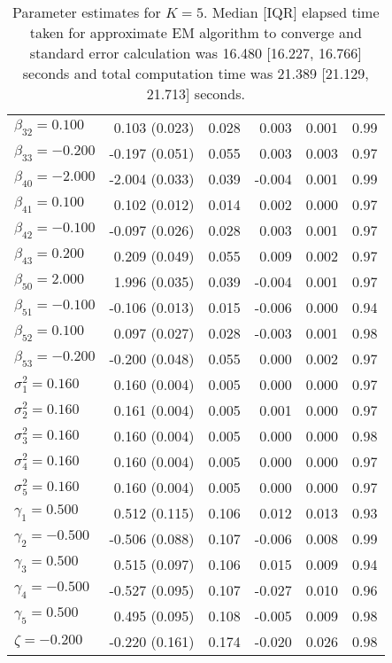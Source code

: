 \begin{table}[ht]
\begin{tabular}{l|rrrrr}
  $\beta_{32} = 0.100$ &  0.103 (0.023) & 0.028 &  0.003 & 0.001 & 0.99 \\ 
  $\beta_{33} = -0.200$ & -0.197 (0.051) & 0.055 &  0.003 & 0.003 & 0.97 \\ 
  $\beta_{40} = -2.000$ & -2.004 (0.033) & 0.039 & -0.004 & 0.001 & 0.99 \\ 
  $\beta_{41} = 0.100$ &  0.102 (0.012) & 0.014 &  0.002 & 0.000 & 0.97 \\ 
  $\beta_{42} = -0.100$ & -0.097 (0.026) & 0.028 &  0.003 & 0.001 & 0.97 \\ 
  $\beta_{43} = 0.200$ &  0.209 (0.049) & 0.055 &  0.009 & 0.002 & 0.97 \\ 
  $\beta_{50} = 2.000$ &  1.996 (0.035) & 0.039 & -0.004 & 0.001 & 0.97 \\ 
  $\beta_{51} = -0.100$ & -0.106 (0.013) & 0.015 & -0.006 & 0.000 & 0.94 \\ 
  $\beta_{52} = 0.100$ &  0.097 (0.027) & 0.028 & -0.003 & 0.001 & 0.98 \\ 
  $\beta_{53} = -0.200$ & -0.200 (0.048) & 0.055 &  0.000 & 0.002 & 0.97 \\ 
  $\sigma^2_1 = 0.160$ &  0.160 (0.004) & 0.005 &  0.000 & 0.000 & 0.97 \\ 
  $\sigma^2_2 = 0.160$ &  0.161 (0.004) & 0.005 &  0.001 & 0.000 & 0.97 \\ 
  $\sigma^2_3 = 0.160$ &  0.160 (0.004) & 0.005 &  0.000 & 0.000 & 0.98 \\ 
  $\sigma^2_4 = 0.160$ &  0.160 (0.004) & 0.005 &  0.000 & 0.000 & 0.97 \\ 
  $\sigma^2_5 = 0.160$ &  0.160 (0.004) & 0.005 &  0.000 & 0.000 & 0.97 \\ 
  $\gamma_1 = 0.500$ &  0.512 (0.115) & 0.106 &  0.012 & 0.013 & 0.93 \\ 
  $\gamma_2 = -0.500$ & -0.506 (0.088) & 0.107 & -0.006 & 0.008 & 0.99 \\ 
  $\gamma_3 = 0.500$ &  0.515 (0.097) & 0.106 &  0.015 & 0.009 & 0.94 \\ 
  $\gamma_4 = -0.500$ & -0.527 (0.095) & 0.107 & -0.027 & 0.010 & 0.96 \\ 
  $\gamma_5 = 0.500$ &  0.495 (0.095) & 0.108 & -0.005 & 0.009 & 0.98 \\ 
  $\zeta = -0.200$ & -0.220 (0.161) & 0.174 & -0.020 & 0.026 & 0.98 \\ 
   \hline
\end{tabular}
\endgroup
\caption{Parameter estimates for $K=5$. Median [IQR] elapsed time taken for approximate EM algorithm to converge and standard error calculation was 16.480 [16.227, 16.766] seconds and total computation time was 21.389 [21.129, 21.713] seconds.} 
\end{table}
